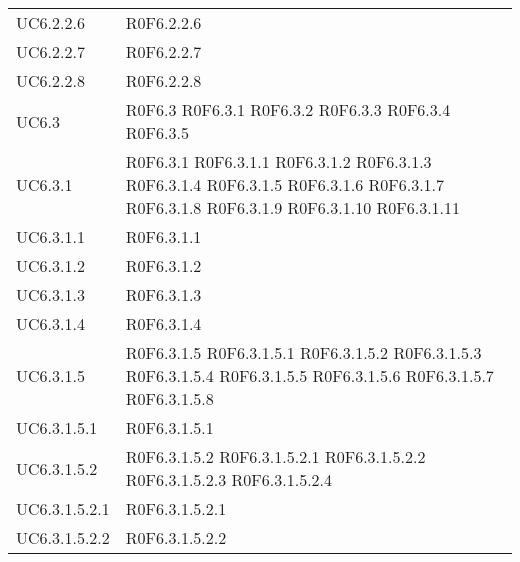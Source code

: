 \begin{longtable}{p{2.5cm}!{\VRule[1pt]}p{5.5cm}}
UC6.2.2.6 & R0F6.2.2.6\\
UC6.2.2.7 & R0F6.2.2.7\\
UC6.2.2.8 & R0F6.2.2.8\\
UC6.3 & R0F6.3
	\newline R0F6.3.1
	\newline R0F6.3.2
	\newline R0F6.3.3
	\newline R0F6.3.4
	\newline R0F6.3.5\\
UC6.3.1 & R0F6.3.1
	\newline R0F6.3.1.1
	\newline R0F6.3.1.2
	\newline R0F6.3.1.3
	\newline R0F6.3.1.4
	\newline R0F6.3.1.5
	\newline R0F6.3.1.6
	\newline R0F6.3.1.7
	\newline R0F6.3.1.8
	\newline R0F6.3.1.9
	\newline R0F6.3.1.10
	\newline R0F6.3.1.11\\
UC6.3.1.1 & R0F6.3.1.1\\
UC6.3.1.2 & R0F6.3.1.2\\
UC6.3.1.3 & R0F6.3.1.3\\
UC6.3.1.4 & R0F6.3.1.4\\
UC6.3.1.5 & R0F6.3.1.5
	\newline R0F6.3.1.5.1
	\newline R0F6.3.1.5.2
	\newline R0F6.3.1.5.3
	\newline R0F6.3.1.5.4
	\newline R0F6.3.1.5.5
	\newline R0F6.3.1.5.6
	\newline R0F6.3.1.5.7
	\newline R0F6.3.1.5.8\\
UC6.3.1.5.1 & R0F6.3.1.5.1\\
UC6.3.1.5.2 & R0F6.3.1.5.2
	\newline R0F6.3.1.5.2.1
	\newline R0F6.3.1.5.2.2
	\newline R0F6.3.1.5.2.3
	\newline R0F6.3.1.5.2.4\\
UC6.3.1.5.2.1 & R0F6.3.1.5.2.1\\
UC6.3.1.5.2.2 & R0F6.3.1.5.2.2\\

\end{longtable}
